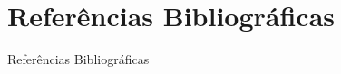 \section{Referências Bibliográficas}

\begin{frame}{Referências Bibliográficas}


  
%  
  

\end{frame}

